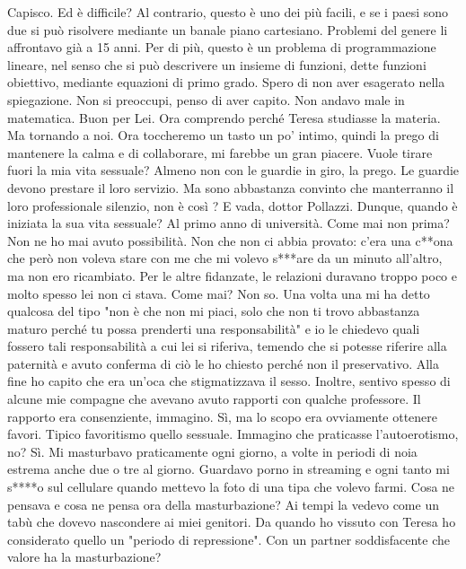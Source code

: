 \documentclass[a4paper,12pt]{article}
\newcommand{\Walter}{\speak{W}}
\newcommand{\Pollazzi}{\speak{P}}
\begin{document}
\begin{dialogue}
\Pollazzi  Capisco. Ed è difficile?
\Walter  Al contrario, questo è uno dei più facili, e se i paesi sono due si può risolvere mediante un banale piano cartesiano. Problemi del genere li affrontavo già a 15 anni. Per di più, questo è un problema di programmazione lineare, nel senso che si può descrivere un insieme di funzioni, dette funzioni obiettivo, mediante equazioni di primo grado. Spero di non aver esagerato nella spiegazione.
\Pollazzi  Non si preoccupi, penso di aver capito. Non andavo male in matematica.
\Walter  Buon per Lei.
\Pollazzi  Ora comprendo perché Teresa studiasse la materia. Ma tornando a noi. Ora toccheremo un tasto un po' intimo, quindi la prego di mantenere la calma e di collaborare, mi farebbe un gran piacere.
\Walter  Vuole tirare fuori la mia vita sessuale? Almeno non con le guardie in giro, la prego.
\Pollazzi  Le guardie devono prestare il loro servizio. Ma sono abbastanza
convinto che manterranno il loro professionale silenzio, non è così ?
\Walter  E vada, dottor Pollazzi.
\Pollazzi  Dunque, quando è iniziata la sua vita sessuale?
\Walter  Al primo anno di università.
\Pollazzi  Come mai non prima?
\Walter  Non ne ho mai avuto possibilità. Non che non ci abbia provato: c'era una c**ona che però non voleva stare con me che mi volevo s***are da un minuto all'altro, ma non ero ricambiato. Per le altre fidanzate, le relazioni duravano troppo poco e molto spesso lei non ci stava.
\Pollazzi  Come mai?
\Walter  Non so. Una volta una mi ha detto qualcosa del tipo "non è che non mi piaci, solo che non ti trovo abbastanza maturo perché tu possa prenderti una responsabilità" e io le chiedevo quali fossero tali responsabilità a cui lei si riferiva, temendo che si potesse riferire alla paternità e avuto conferma di ciò le ho chiesto perché non il preservativo. Alla fine ho capito che era un'oca che stigmatizzava il sesso. Inoltre, sentivo spesso di alcune mie compagne che avevano avuto rapporti con qualche professore.
\Pollazzi  Il rapporto era consenziente, immagino.
\Walter  Sì, ma lo scopo era ovviamente ottenere favori. Tipico favoritismo quello sessuale.
\Pollazzi  Immagino che praticasse l'autoerotismo, no?
\Walter  Sì. Mi masturbavo praticamente ogni giorno, a volte in periodi di noia estrema anche due o tre al giorno. Guardavo porno in streaming e ogni tanto mi s****o sul cellulare quando mettevo la foto di una tipa che volevo farmi.
\Pollazzi  Cosa ne pensava e cosa ne pensa ora della masturbazione?
\Walter  Ai tempi la vedevo come un tabù che dovevo nascondere ai miei genitori. Da quando ho vissuto con Teresa ho considerato quello un "periodo di repressione". Con un partner soddisfacente che valore ha la masturbazione?

\end{dialogue}
\end{document}
